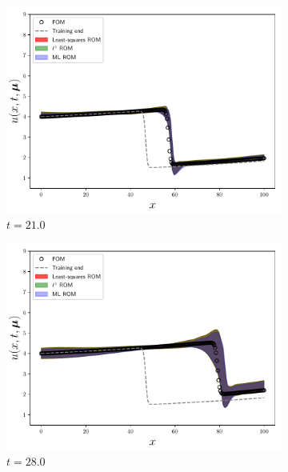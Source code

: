 \documentclass[3p,computermodern,10pt]{elsarticle}
\begin{document}
\begin{figure}
\begin{center}
\begin{subfigure}[t]{0.24\textwidth}
\includegraphics[trim={0cm 0cm 0cm 0cm},clip,width=1.0\linewidth]{code/burgers/synapse_models/elu/results/usolExtrapolate_0005.pdf} 
\caption{$t=21.0$}
\end{subfigure}
\begin{subfigure}[t]{0.24\textwidth}
\includegraphics[trim={0cm 0cm 0cm 0cm},clip,width=1.0\linewidth]{code/burgers/synapse_models/elu/results/usolExtrapolate_0007.pdf} 
\caption{$t=28.0$}
\end{subfigure}
\begin{subfigure}[t]{0.24\textwidth}

\end{subfigure}
\end{center}
\end{figure}
\end{document}
